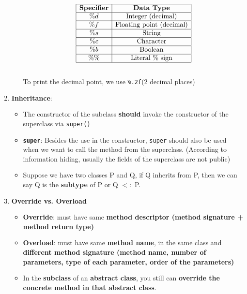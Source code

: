\documentclass[10pt, landscape]{article}
\begin{document}
\begin{multicols}{4}
\begin{enumerate}
\begin{itemize}
        \[
        \begin{array}{|c|c|}
        \hline
        \textbf{Specifier} & \textbf{Data Type} \\
        \hline
        \%d & \text{Integer (decimal)} \\
        \hline
        \%f & \text{Floating~point (decimal)} \\
        \hline
        \%s & \text{String} \\
        \hline
        \%c & \text{Character} \\
        \hline
        \%b & \text{Boolean} \\
        \hline
        \%\% & \text{Literal \% sign} \\
        \hline
        \end{array}
        \]
        \\
        To print the decimal point, we use \texttt{\%.2f}(2 decimal places)
    \end{itemize}
    \item \textbf{Inheritance}:
    \begin{itemize}
        \item The constructor of the subclass \textbf{should} invoke the constructor of the superclass via \texttt{super()}
        \item \textbf{\texttt{super}}: Besides the use in the constructor, \texttt{super} should also be used when we want to call the method from the superclass. (According to information hiding, usually the fields of the superclass are not public)
        \item Suppose we have two classes P and Q, if Q inherits from P, then we can say Q is the \textbf{subtype} of P or Q $<:$ P.
    \end{itemize}
    \item \textbf{Override vs. Overload}
    \begin{itemize}
        \item \textbf{Override}: must have same \textbf{method descriptor (method signature + method return type)}
        \item \textbf{Overload}: must have same \textbf{method name}, in the same class and \textbf{different method signature (method name, number of parameters, type of each parameter, order of the parameters)}
        \item In the \textbf{subclass} of an \textbf{abstract class}, you still can \textbf{override the concrete method in that abstract class}.
    \end{itemize}

\end{enumerate}
\end{multicols}
\end{document}
